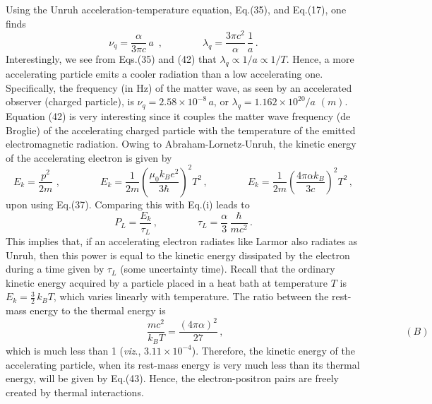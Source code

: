 \documentclass[12pt]{article}
\begin{document}
Using the Unruh acceleration-temperature equation, Eq.(35), and Eq.(17), one finds
\begin{equation}
\nu_q=\frac{\alpha}{3\pi c}\, a\,\,\,,\qquad\qquad \lambda_q=\frac{3\pi c^2}{\alpha}\,\frac{1}{a}\,.
\end{equation}
Interestingly, we see from Eqs.(35) and (42) that $\lambda_q\propto 1/a\propto 1/T$. Hence, a more accelerating particle emits a cooler radiation than a low accelerating one. Specifically, the frequency (in Hz) of the  matter wave,  as seen by an accelerated observer (charged particle), is  $\nu_q=2.58\times 10^{-8}\,a $, or $\lambda_q=1.162\times 10^{20}/a\,\, (m)$. Equation (42) is very interesting since it couples the  matter wave frequency (de Broglie) of the accelerating charged particle with the temperature of the emitted electromagnetic radiation. Owing to Abraham-Lornetz-Unruh, the kinetic energy of the accelerating electron  is given by
\begin{equation}
E_k=\frac{p^2}{2m}\,\,,\qquad\qquad E_k=\frac{1}{2m}\left(\frac{\mu_0k_Be^2}{3\hbar}\right)^2T^2\,,\qquad\qquad E_k=\frac{1}{2m}\left(\frac{4\pi\alpha k_B}{3c}\right)^2T^2\,,
\end{equation}
upon using Eq.(37). Comparing this with Eq.(i) leads to
$$P_L=\frac{E_k}{\tau_L}\,,\qquad\qquad \tau_L=\frac{\alpha}{3}\,\frac{\hbar}{mc^2}\,.$$
This implies that, if an accelerating electron radiates like Larmor also radiates as Unruh, then this power is equal to the kinetic energy dissipated by the electron during a time given by $\tau_L$ (some uncertainty time). Recall that the ordinary kinetic energy acquired by a particle placed in a heat bath  at temperature $T$ is  $E_k=\frac{3}{2}\,k_BT$, which varies linearly with temperature. The ratio between the rest-mass energy to the thermal energy is
$$\hspace{6cm}\frac{mc^2}{k_BT}=\frac{(4\pi\alpha)^2}{27}\,,\qquad\qquad\hspace{6cm} (B)$$
which is much less than 1 (\emph{viz}., $3.11\times 10^{-4}$). Therefore, the kinetic energy of the accelerating particle, when its rest-mass energy is very much less than its thermal energy,  will be given by Eq.(43). Hence, the electron-positron pairs are freely created by thermal interactions.
\end{document}
